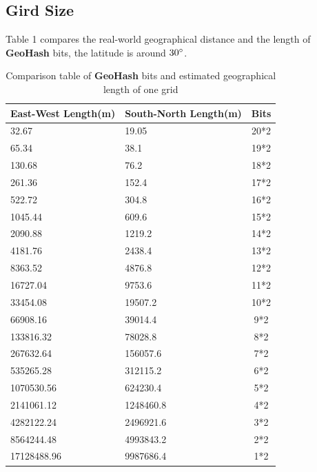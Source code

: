 \documentclass[conference]{IEEEtran}
\begin{document}
\subsection{Gird Size}
Table 1 compares the real-world geographical distance and the length of \textbf{GeoHash} bits, the latitude is around $30\degree$.
\begin{table}[h]
    \centering
    \caption{Comparison table of \textbf{GeoHash} bits and estimated geographical length of one grid}
    \begin{tabular}{llc}
        \toprule
        East-West Length(m) & South-North Length(m) & Bits \\
        \midrule
        32.67               & 19.05                 & 20*2 \\
        65.34               & 38.1                  & 19*2 \\
        130.68              & 76.2                  & 18*2 \\
        261.36              & 152.4                 & 17*2 \\
        522.72              & 304.8                 & 16*2 \\
        1045.44             & 609.6                 & 15*2 \\
        2090.88             & 1219.2                & 14*2 \\
        4181.76             & 2438.4                & 13*2 \\
        8363.52             & 4876.8                & 12*2 \\
        16727.04            & 9753.6                & 11*2 \\
        33454.08            & 19507.2               & 10*2 \\
        66908.16            & 39014.4               & 9*2  \\
        133816.32           & 78028.8               & 8*2  \\
        267632.64           & 156057.6              & 7*2  \\
        535265.28           & 312115.2              & 6*2  \\
        1070530.56          & 624230.4              & 5*2  \\
        2141061.12          & 1248460.8             & 4*2  \\
        4282122.24          & 2496921.6             & 3*2  \\
        8564244.48          & 4993843.2             & 2*2  \\
        17128488.96         & 9987686.4             & 1*2  \\
        \bottomrule
    \end{tabular}
\end{table}
\end{document}
